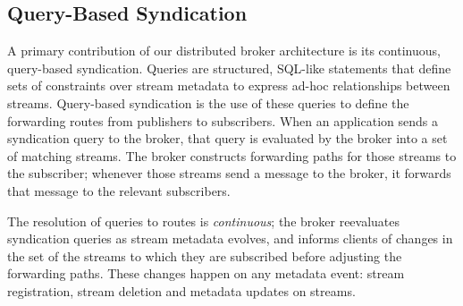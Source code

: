 %
%
\subsection{Query-Based Syndication}

A primary contribution of our distributed broker architecture is its continuous, query-based syndication.
Queries are structured, SQL-like statements that define sets of constraints over stream metadata to express ad-hoc relationships between streams.
Query-based syndication is the use of these queries to define the forwarding routes from publishers to subscribers.
When an application sends a syndication query to the broker, that query is evaluated by the broker into a set of matching streams.
The broker constructs forwarding paths for those streams to the subscriber; whenever those streams send a message to the broker, it forwards that message to the relevant subscribers.

The resolution of queries to routes is \emph{continuous}; the broker reevaluates syndication queries as stream metadata evolves, and informs clients of changes in the set of the streams to which they are subscribed before adjusting the forwarding paths.
These changes happen on any metadata event: stream registration, stream deletion and metadata updates on streams.


